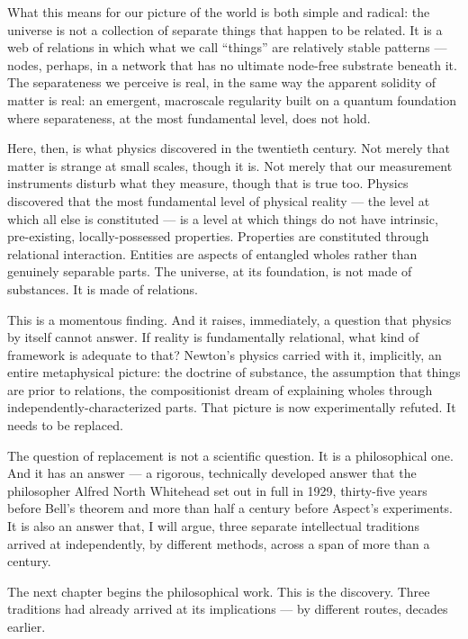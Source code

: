 What this means for our picture of the world is both simple and radical: the universe is not a collection of separate things that happen to be related. It is a web of relations in which what we call ``things'' are relatively stable patterns --- nodes, perhaps, in a network that has no ultimate node-free substrate beneath it. The separateness we perceive is real, in the same way the apparent solidity of matter is real: an emergent, macroscale regularity built on a quantum foundation where separateness, at the most fundamental level, does not hold.


Here, then, is what physics discovered in the twentieth century. Not merely that matter is strange at small scales, though it is. Not merely that our measurement instruments disturb what they measure, though that is true too. Physics discovered that the most fundamental level of physical reality --- the level at which all else is constituted --- is a level at which things do not have intrinsic, pre-existing, locally-possessed properties. Properties are constituted through relational interaction. Entities are aspects of entangled wholes rather than genuinely separable parts. The universe, at its foundation, is not made of substances. It is made of relations.

This is a momentous finding. And it raises, immediately, a question that physics by itself cannot answer. If reality is fundamentally relational, what kind of framework is adequate to that? Newton's physics carried with it, implicitly, an entire metaphysical picture: the doctrine of substance, the assumption that things are prior to relations, the compositionist dream of explaining wholes through independently-characterized parts. That picture is now experimentally refuted. It needs to be replaced.

The question of replacement is not a scientific question. It is a philosophical one. And it has an answer --- a rigorous, technically developed answer that the philosopher Alfred North Whitehead set out in full in 1929, thirty-five years before Bell's theorem and more than half a century before Aspect's experiments. It is also an answer that, I will argue, three separate intellectual traditions arrived at independently, by different methods, across a span of more than a century.

The next chapter begins the philosophical work. This is the discovery. Three traditions had already arrived at its implications --- by different routes, decades earlier.

